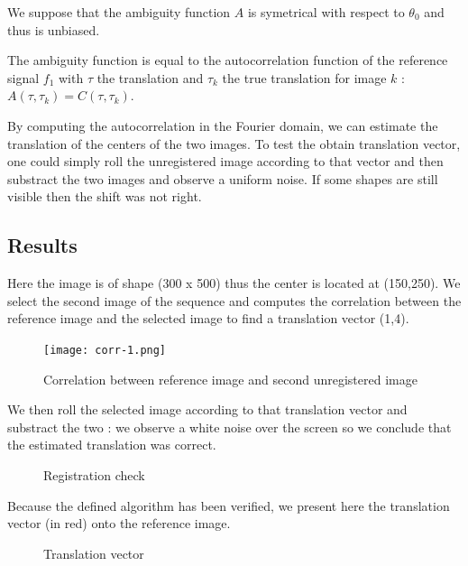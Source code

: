 We suppose that the ambiguity function $A$ is symetrical with respect to $\theta_0$ and thus is unbiased.

The ambiguity function is equal to the autocorrelation function of the reference signal $f_1$ with $\tau$ the translation and $\tau_k$ the true translation for image $k$ : $ A(\tau, \tau_k) = C(\tau, \tau_k) $. 

By computing the autocorrelation in the Fourier domain, we can estimate the translation of the centers of the two images. To test the obtain translation vector, one could simply roll the unregistered image according to that vector and then substract the two images and observe a uniform noise. If some shapes are still visible then the shift was not right.

\subsection{Results}
Here the image is of shape (300 x 500) thus the center is located at (150,250). We select the second image of the sequence and computes the correlation between the reference image and the selected image to find a translation vector (1,4).

\begin{figure}[h]
	\centering
	\texttt{[image: corr-1.png]}
	\caption{Correlation between reference image and second unregistered image}
	\label{fig:corr-1}
\end{figure}

We then roll the selected image according to that translation vector and substract the two : we observe a white noise over the screen so we conclude that the estimated translation was correct.

\begin{figure}[h]
    \centering
	\caption{Registration check}
\end{figure}

Because the defined algorithm has been verified, we present here the translation vector (in red) onto the reference image.

\begin{figure}[h]
    \centering
	\caption{Translation vector}
\end{figure}

